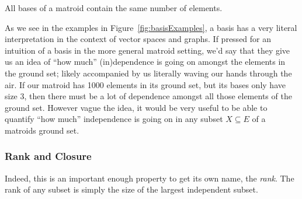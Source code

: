 \documentclass[12pt,oneside]{../../sfsuthesis}
\begin{document}
\begin{proposition}\th\label{thm:basesSameSize}
    All bases of a matroid contain the same number of elements.
\end{proposition}




As we see in the examples in Figure~\ref{fig:basisExamples}, a basis has a very literal interpretation in the context of vector spaces and graphs.
If pressed for an intuition of a basis in the more general matroid setting, we'd say that they give us an idea of ``how much'' (in)dependence is going on amongst the elements in the ground set; likely accompanied by us literally waving our hands through the air.
If our matroid has 1000 elements in its ground set, but its bases only have size 3, then there must be a lot of dependence amongst all those elements of the ground set.
However vague the idea, it would be very useful to be able to quantify ``how much'' independence is going on in any subset \( X \subseteq E \) of a matroids ground set.

\subsubsection{Rank and Closure}

Indeed, this is an important enough property to get its own name, the \emph{rank}.
The rank of any subset is simply the size of the largest independent subset.
\end{document}
